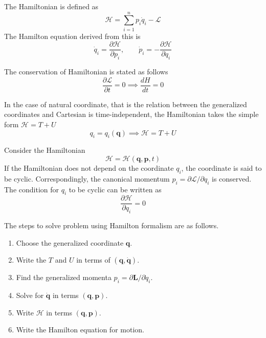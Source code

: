 \documentclass[../../../main.tex]{subfiles}
\begin{document}
The Hamiltonian is defined as
\begin{equation*}
	\mathcal{H}=\sum_{i=1}^{n}p_i\dot{q}_i-\mathcal{L}
\end{equation*}
The Hamilton equation derived from this is
\begin{equation*}
	\dot{q}_i=\frac{\partial\mathcal{H}}{\partial p_i},\qquad\dot{p}_i=-\frac{\partial\mathcal{H}}{\partial q_i}
\end{equation*}

The conservation of Hamiltonian is stated as follows
\begin{equation*}
	\frac{\partial\mathcal{L}}{\partial t}=0\implies\frac{dH}{dt}=0
\end{equation*}

In the case of natural coordinate, that is the relation between the generalized coordinates and Cartesian is time-independent, the Hamiltonian takes the simple form $\mathcal{H}=T+U$
\begin{equation*}
	q_i=q_i(\mathbf{q})\implies\mathcal{H}=T+U
\end{equation*}

Consider the Hamiltonian
\begin{equation*}
	\mathcal{H }=\mathcal{H }\left( \mathbf{q}, \mathbf{p},t \right)
\end{equation*}
If the Hamiltonian does not depend on the coordinate $q_i$, the coordinate is said to be cyclic.
Correspondingly, the canonical momentum $p_i= \partial \mathcal{L }/\partial q_i$ is conserved.
The condition for $q_i$ to be cyclic can be written as
\begin{equation*}
	\frac{\partial \mathcal{H }}{\partial q_i }=0
\end{equation*}

The steps to solve problem using Hamilton formalism are as follows.
\begin{enumerate}
	\item Choose the generalized coordinate $\mathbf{q}$.
	\item Write the $T$ and $U$ in terms of $(\mathbf{q},\dot{\mathbf{q}})$.
	\item Find the generalized momenta $p_i=\partial\mathbf{L}/\partial \dot{q}_i$.
	\item Solve for $\dot{\mathbf{q}}$ in terms $(\mathbf{q},\mathbf{p})$.
	\item Write $\mathcal{H}$ in terms $(\mathbf{q},\mathbf{p})$.
	\item Write the Hamilton equation for motion.
\end{enumerate}
\end{document}
